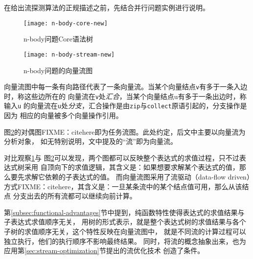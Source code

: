 在给出流探测算法的正规描述之前，先结合并行问题实例进行说明。
\begin{quotation}
\end{quotation}
\begin{figure}
  \centering
  \texttt{[image: n-body-core-new]}
  \caption{n-body问题Core语法树}
  \label{fig:n-body-core}
\end{figure}
\begin{figure}
  \centering
  \texttt{[image: n-body-stream-new]}
  \caption{n-body问题的向量流图}
  \label{fig:n-body-stream}
\end{figure}

向量流图中每一条有向路径代表了一条向量流。当某个向量结点\texttt{v}有多于一条入边时，称这些边所在的
向量流在\texttt{v}处\emph{汇合}，当某个向量结点u有多于一条出边时，称输入\texttt{u}
的向量流在\texttt{u}处\emph{分支}，汇合操作是由\texttt{zip}与\texttt{collect}原语引起的，分支操作是因为
相应的向量被多个向量操作引用。

图\ref{fig:n-body-stream}的对偶图FIXME：citehere即为任务流图。此处约定，后文中主要以向量流为分析对象，
如无特别说明，文中提及的“流”即为向量流。

对比观察\ref{fig:n-body-core}与
图\ref{fig:n-body-stream}可以发现，两个图都可以反映整个表达式的求值过程，只不过表达式树采用
自顶向下的求值逻辑，其含义是：如果想要求解某个表达式的值，那么要先求解它依赖的子表达式的值。
而向量流图采用了流驱动（data-flow driven）方式FIXME：citehere，其含义是：一旦某条流中的某个结点值可用，那么从该结点
分支出去的所有流都可以继续向前计算。

第\ref{subsec:functional-advantages}节中提到，纯函数特性使得表达式的求值结果与子表达式求值顺序无关，
用树的形式表示，就是整个表达式树的求值结果与各个子树的求值顺序无关，这个特性反映在向量流图中，
就是不同流的计算过程可以独立执行，他们的执行顺序不影响最终结果。
同时，将流的概念抽象出来，也为应用第\ref{sec:stream-optimization}节提出的流优化技术
创造了条件。

